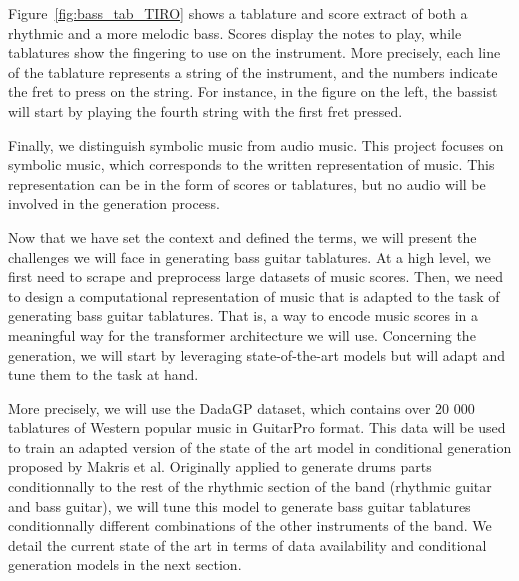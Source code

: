 Figure~\ref{fig:bass_tab_TIRO} shows a tablature and score extract of both a rhythmic and a more melodic bass.
Scores display the notes to play, while tablatures show the fingering to use on the instrument.
More precisely, each line of the tablature represents a string of the instrument, and the numbers indicate the fret to press on the string.
For instance, in the figure on the left, the bassist will start by playing the fourth string with the first fret pressed.

Finally, we distinguish symbolic music from audio music.
This project focuses on symbolic music, which corresponds to the written representation of music.
This representation can be in the form of scores or tablatures, but no audio will be involved in the generation process.


Now that we have set the context and defined the terms, we will present the challenges we will face in generating bass guitar tablatures.
At a high level, we first need to scrape and preprocess large datasets of music scores.
Then, we need to design a computational representation of music that is adapted to the task of generating bass guitar tablatures.
That is, a way to encode music scores in a meaningful way for the transformer architecture we will use.
Concerning the generation, we will start by leveraging state-of-the-art models but will adapt and tune them to the task at hand.

More precisely, we will use the DadaGP dataset, which contains over 20 000 tablatures of Western popular music in GuitarPro format.
This data will be used to train an adapted version of the state of the art model in conditional generation proposed by Makris et al.
Originally applied to generate drums parts conditionnally to the rest of the rhythmic section of the band (rhythmic guitar and bass guitar),
we will tune this model to generate bass guitar tablatures conditionnally different combinations of the other instruments of the band.
We detail the current state of the art in terms of data availability and conditional generation models in the next section.